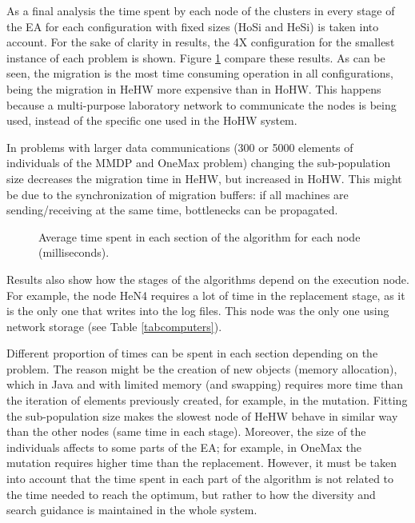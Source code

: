 \documentclass[final,1p,times]{elsarticle}
\begin{document}
As a final analysis the time spent by each node of the clusters in
every stage of the EA for each configuration with fixed sizes (HoSi
and HeSi) is taken into account. For the sake of clarity in results, 
 the 4X configuration for the smallest instance of each problem is shown. Figure \ref{fig:bars} compare these results. As can be seen, the migration is the most time consuming operation in all configurations, being the migration in HeHW more expensive than in HoHW. This happens because a multi-purpose laboratory network to communicate
the nodes is being used, instead of the specific one used in the HoHW
system. 

 In problems with larger data communications (300 or 5000 elements of individuals of the MMDP and OneMax problem) changing the sub-population size decreases the migration time in HeHW, but increased in HoHW. This might be due to the synchronization of migration buffers: if all machines are sending/receiving at the same time, bottlenecks can be propagated.

\begin{figure}[ht]
\centering
{}
\caption{Average time spent in each section of the algorithm for each node (milliseconds).}
\label{fig:bars}
\end{figure}



Results also show how the stages of the algorithms depend on the execution
node. For example, the node HeN4 requires a lot of time in the replacement stage,
 as it is the only one that writes into the log files. This node was the only one
  using network storage (see Table \ref{tabcomputers}).

Different proportion of times can be spent in each section depending on the problem.
The reason might be the
creation of new objects (memory allocation), which in Java and with
limited memory (and swapping) requires more time than the iteration of
elements previously created, for example, in the mutation. Fitting
the sub-population size makes the slowest node of HeHW behave in similar
way than the other nodes (same time in each stage). Moreover, the size
of the individuals affects to some parts of the EA; for example, in 
OneMax the mutation requires higher time than the replacement. However,
it must be taken into account that the time spent in each part of the
algorithm is not related to the time needed to reach the optimum, but rather to
how the diversity and search guidance is maintained in the whole
system.  
\end{document}
